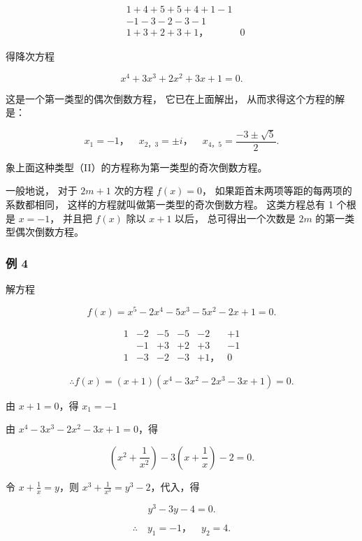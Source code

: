 \[
\begin{array}{rll} & 1 + 4 + 5 + 5 + 4 + 1 - 1 \\ & - 1 - 3 - 2 - 3 - 1 \\ \hline {} & 1 + 3 + 2 + 3 + 1\text{，} & 0 \end{array}
\]

得降次方程

\[
x ^ {4} + 3 x ^ {3} + 2 x ^ {2} + 3 x + 1 = 0.
\]

这是一个第一类型的偶次倒数方程， 它已在上面解出，
从而求得这个方程的解是：

\[
x _ {1} = - 1\text{，} \quad x _ {2\text{，} 3} = \pm i\text{，} \quad x _ {4\text{，} 5} = \frac {- 3 \pm \sqrt {5}}{2}.
\]

象上面这种类型（II）的方程称为第一类型的奇次倒数方程。

一般地说， 对于 \(2m + 1\) 次的方程 \(f(x) = 0\)，
如果距首末两项等距的每两项的系数都相同，
这样的方程就叫做第一类型的奇次倒数方程。 这类方程总有 1 个根是
\(x = -1\)， 并且把 \(f(x)\) 除以 \(x + 1\) 以后， 总可得出一个次数是
\(2m\) 的第一类型偶次倒数方程。

\subsubsection{例 4}

解方程

\[
f (x) = x ^ {5} - 2 x ^ {4} - 5 x ^ {3} - 5 x ^ {2} - 2 x + 1 = 0.
\]


\[
\begin{array}{cccccc} 1 & - 2 & - 5 & - 5 & - 2 & + 1 \\ & - 1 & + 3 & + 2 & + 3 & - 1 \\ \hline 1 & - 3 & - 2 & - 3 & + 1\text{，} & 0 \end{array}
\]

\[
\therefore f (x) = (x + 1) \left(x ^ {4} - 3 x ^ {2} - 2 x ^ {3} - 3 x + 1\right) = 0.
\]

由 \(x + 1 = 0\)，得 \(x_{1} = -1\)

由 \(x^4 - 3x^3 - 2x^2 - 3x + 1 = 0\)，得

\[
\left(x ^ {2} + \frac {1}{x ^ {2}}\right) - 3 \left(x + \frac {1}{x}\right) - 2 = 0.
\]

令 \(x + \frac{1}{x} = y\)，则
\(x^{3} + \frac{1}{x^{3}} = y^{3} - 2\)，代入，得

\[
y ^ {3} - 3 y - 4 = 0.
\]

\[
\therefore \quad y _ {1} = - 1\text{，} \quad y _ {2} = 4.
\]

